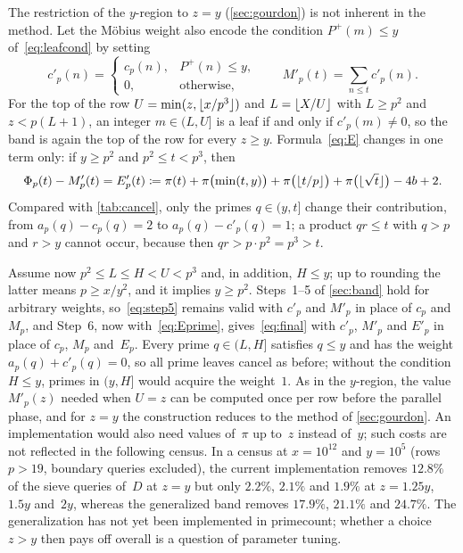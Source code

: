 \documentclass[11pt,a4paper]{amsart}
\numberwithin{equation}{section}
\DeclarePairedDelimiter{\floor}{\lfloor}{\rfloor}
\newcommand{\Pplus}{P^{+}}
\begin{document}
The restriction of the $y$-region to $z=y$ (\cref{sec:gourdon}) is not inherent
in the method. Let the M\"obius weight also encode the condition
$\Pplus(m)\le y$ of~\eqref{eq:leafcond} by setting
\[
  c'_p(n)=\begin{cases}c_p(n), & \Pplus(n)\le y,\\ 0, & \text{otherwise},\end{cases}
  \qquad
  M'_p(t)=\sum_{n\le t}c'_p(n).
\]
For the top of the row $U=\min(z,\floor{x/p^3})$ and $L=\floor{X/U}$ with
$L\ge p^2$ and $z<p(L+1)$, an integer $m\in(L,U]$ is a leaf if and only if
$c'_p(m)\ne0$, so the band is again the top of the row for every $z\ge y$.
Formula~\eqref{eq:E} changes in one term only: if $y\ge p^2$ and
$p^2\le t<p^3$, then
\begin{equation}\label{eq:Eprime}
  \Phi_p(t)-M'_p(t)=E'_p(t)\coloneqq\pi(t)+\pi\bigl(\min(t,y)\bigr)
  +\pi\bigl(\floor{t/p}\bigr)+\pi\bigl(\floor{\sqrt t}\bigr)-4b+2.
\end{equation}
Compared with \cref{tab:cancel}, only the primes $q\in(y,t]$ change their
contribution, from $a_p(q)-c_p(q)=2$ to $a_p(q)-c'_p(q)=1$; a product $qr\le t$
with $q>p$ and $r>y$ cannot occur, because then $qr>p\cdot p^2=p^3>t$.

Assume now $p^2\le L\le H<U<p^3$ and, in addition, $H\le y$; up to rounding the
latter means $p\ge x/y^2$, and it implies $y\ge p^2$. Steps~1--5 of
\cref{sec:band} hold for arbitrary weights, so~\eqref{eq:step5} remains valid
with $c'_p$ and $M'_p$ in place of $c_p$ and~$M_p$, and Step~6, now
with~\eqref{eq:Eprime}, gives~\eqref{eq:final} with $c'_p$, $M'_p$ and $E'_p$ in
place of $c_p$, $M_p$ and~$E_p$. Every prime $q\in(L,H]$ satisfies $q\le y$ and
has the weight $a_p(q)+c'_p(q)=0$, so all prime leaves cancel as before; without
the condition $H\le y$, primes in $(y,H]$ would acquire the weight~$1$. As in
the $y$-region, the value $M'_p(z)$ needed when $U=z$ can be computed once per row before the parallel
phase, and for $z=y$ the construction reduces to the method of
\cref{sec:gourdon}. An implementation would also need values of~$\pi$ up to~$z$
instead of~$y$; such costs are not reflected in the following census. In a
census at $x=10^{12}$ and $y=10^5$ (rows $p>19$, boundary queries excluded), the
current implementation removes $12.8\%$ of the sieve queries of~$D$ at $z=y$ but
only $2.2\%$, $2.1\%$ and $1.9\%$ at $z=1.25y$, $1.5y$ and~$2y$, whereas the
generalized band removes $17.9\%$, $21.1\%$ and $24.7\%$. The generalization
has not yet been implemented in primecount; whether a choice $z>y$ then pays
off overall is a question of parameter tuning.
\end{document}
